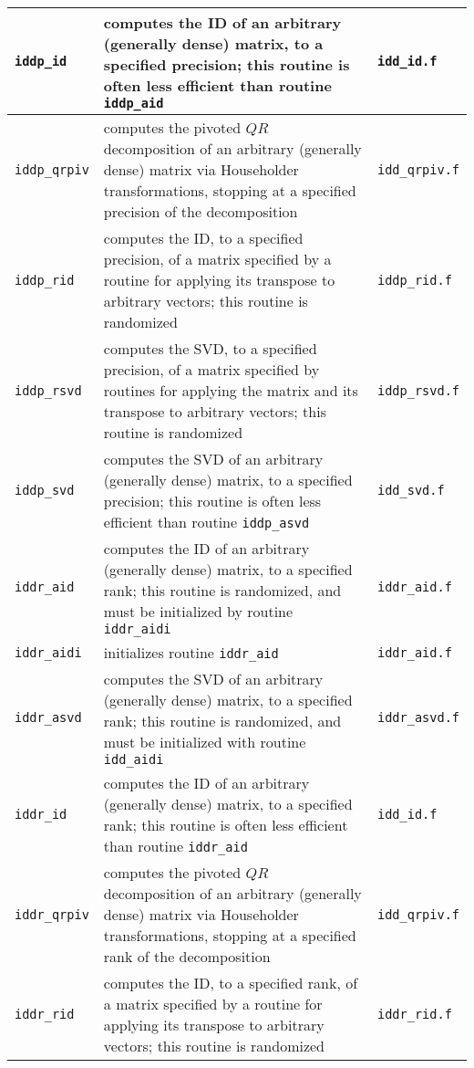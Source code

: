 ﻿\documentclass[letterpaper,12pt]{article}
\begin{document}
\begin{center}
\begin{supertabular}{>{\raggedright}p{1.2in} p{.53\textwidth} l}
\\\hline
%
{\tt iddp\_id} & computes the ID of an arbitrary (generally dense)
matrix, to a specified precision; this routine is often less efficient
than routine {\tt iddp\_aid} & {\tt idd\_id.f} \\\hline
%
{\tt iddp\_qrpiv} & computes the pivoted $QR$ decomposition of an
arbitrary (generally dense) matrix via Householder transformations,
stopping at a specified precision of the decomposition &
{\tt idd\_qrpiv.f} \\\hline
%
{\tt iddp\_rid} & computes the ID, to a specified precision, of a
matrix specified by a routine for applying its transpose to arbitrary
vectors; this routine is randomized & {\tt iddp\_rid.f} \\\hline
%
{\tt iddp\_rsvd} & computes the SVD, to a specified precision, of a
matrix specified by routines for applying the matrix and its transpose
to arbitrary vectors; this routine is randomized & {\tt iddp\_rsvd.f}
\\\hline
%
{\tt iddp\_svd} & computes the SVD of an arbitrary (generally dense)
matrix, to a specified precision; this routine is often less efficient
than routine {\tt iddp\_asvd} & {\tt idd\_svd.f} \\\hline
%
{\tt iddr\_aid} & computes the ID of an arbitrary (generally dense)
matrix, to a specified rank; this routine is randomized, and must be
initialized by routine {\tt iddr\_aidi} & {\tt iddr\_aid.f} \\\hline
%
{\tt iddr\_aidi} & initializes routine {\tt iddr\_aid} &
{\tt iddr\_aid.f} \\\hline
%
{\tt iddr\_asvd} & computes the SVD of an arbitrary (generally dense)
matrix, to a specified rank; this routine is randomized, and must be
initialized with routine {\tt idd\_aidi} & {\tt iddr\_asvd.f}
\\\hline
%
{\tt iddr\_id} & computes the ID of an arbitrary (generally dense)
matrix, to a specified rank; this routine is often less efficient than
routine {\tt iddr\_aid} & {\tt idd\_id.f} \\\hline
%
{\tt iddr\_qrpiv} & computes the pivoted $QR$ decomposition of an
arbitrary (generally dense) matrix via Householder transformations,
stopping at a specified rank of the decomposition & {\tt idd\_qrpiv.f}
\\\hline
%
{\tt iddr\_rid} & computes the ID, to a specified rank, of a matrix
specified by a routine for applying its transpose to arbitrary vectors;
this routine is randomized & {\tt iddr\_rid.f} \\\hline

\end{supertabular}
\end{center}
\end{document}
